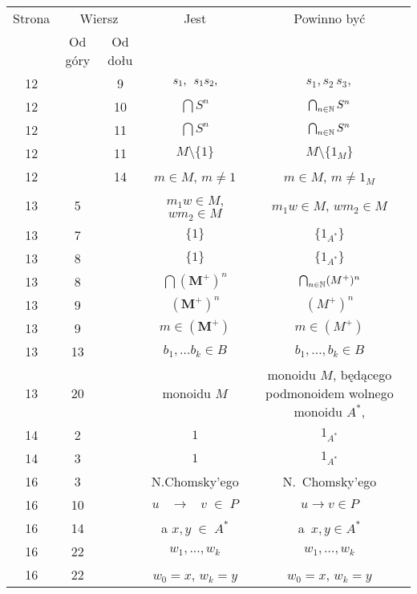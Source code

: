 \documentclass[a4paper,11pt]{article}
\begin{document}
\begin{center}
  \begin{tabular}{|c|c|c|c|c|}
    \hline
    Strona & \multicolumn{2}{c|}{Wiersz} & Jest
                              & Powinno być \\ \cline{2-3}
    & Od góry & Od dołu & & \\
    \hline
    12 & &  9 & $s_{ 1 }, \hspace{0.5em} s_{ 1 } s_{ 2 },$
    & $s_{ 1 }, s_{ 2 } \, s_{ 3 },$ \\
    12 & & 10 & $\bigcap S^{ n }$ & $\bigcap_{ n \in \mathbb{N} } S^{ n }$ \\
    12 & & 11 & $\bigcap S^{ n }$ & $\bigcap_{ n \in \mathbb{N} } S^{ n }$ \\
    12 & & 11 & $M \setminus \{ 1 \} $ & $M \setminus \{ 1_{ M } \} $ \\
    12 & & 14 & $m \in M$,{ } $m \neq 1$ & $m \in M$, $m \neq 1_{ M }$ \\
    13 &  5 & & $m_{ 1 } w \in M$,{ } $w m_{ 2 } \in M$
                & $m_{ 1 } w \in M$, $w m_{ 2 } \in M$ \\
    13 &  7 & & $\{ 1 \}$ & $\{ 1_{ A^{ * } } \}$ \\
    13 &  8 & & $\{ 1 \}$ & $\{ 1_{ A^{ * } } \}$ \\
    13 &  8 & & $\bigcap ( \mathbf{M}^{ + } )^{ n }$
           & $\bigcap_{ n \in \mathbb{N} } ( M^{ + } )^{ n }$ \\
    13 &  9 & & $( \mathbf{M}^{ + } )^{ n }$ & $( M^{ + } )^{ n }$ \\
    13 &  9 & & $m \in ( \mathbf{M}^{ + } )$ & $m \in ( M^{ + } )$ \\
    13 & 13 & & $b_{ 1 }, \ldots b_{ k } \in B$ & $b_{ 1 }, \ldots, b_{ k } \in B$ \\
    13 & 20 & & monoidu $M$
    & monoidu $M$, będącego podmonoidem wolnego monoidu $A^{ * }$, \\
    14  &  2 & & $1$ & $1_{ A^{ * } }$ \\
    14  &  3 & & $1$ & $1_{ A^{ * } }$ \\
    16  &  3 & & N.Chomsky’ego & N.~Chomsky’ego \\
    16  & 10 & & $u \;\;\; \to \;\;\; v \; \in \; P$ & $u \to v \in P$ \\
    16  & 14 & & a{ }{ } $x, y \; \in \; A^{ * }$ & a~$x, y \in A^{ * }$ \\
    16  & 22 & & $w_{ 1 }, ..., w_{ k }$ & $w_{ 1 }, \ldots, w_{ k }$ \\
    16  & 22 & & $w_{ 0 } = x$,{ } $w_{ k } = y$
           & $w_{ 0 } = x$, $w_{ k } = y$ \\

\end{tabular}
\end{center}
\end{document}
